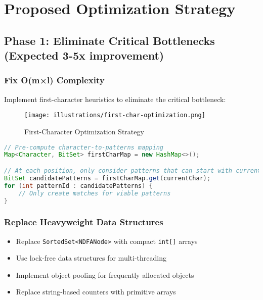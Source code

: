 \documentclass[11pt,a4paper]{article}
\begin{document}
\section{Proposed Optimization Strategy}

\subsection{Phase 1: Eliminate Critical Bottlenecks (Expected 3-5x improvement)}

\subsubsection{Fix O(m×l) Complexity}

Implement first-character heuristics to eliminate the critical bottleneck:

\begin{figure}[htbp]
\centering
\texttt{[image: illustrations/first-char-optimization.png]}
\caption{First-Character Optimization Strategy}
\label{fig:first-char}
\end{figure}

\begin{lstlisting}[language=Java,caption=Proposed first-character optimization]
// Pre-compute character-to-patterns mapping
Map<Character, BitSet> firstCharMap = new HashMap<>();

// At each position, only consider patterns that can start with current char
BitSet candidatePatterns = firstCharMap.get(currentChar);
for (int patternId : candidatePatterns) {
    // Only create matches for viable patterns
}
\end{lstlisting}

\subsubsection{Replace Heavyweight Data Structures}

\begin{itemize}
\item Replace \texttt{SortedSet<NDFANode>} with compact \texttt{int[]} arrays
\item Use lock-free data structures for multi-threading
\item Implement object pooling for frequently allocated objects
\item Replace string-based counters with primitive arrays
\end{itemize}
\end{document}
